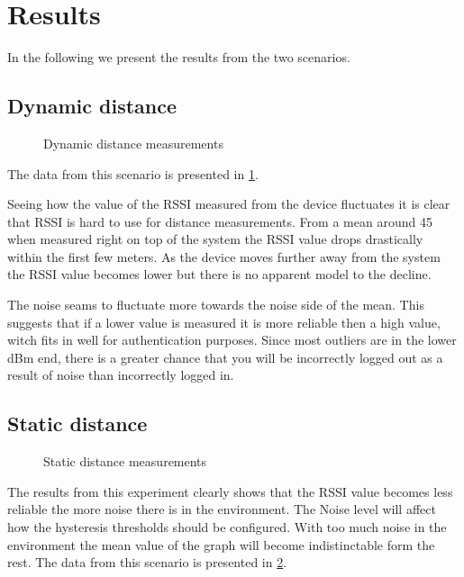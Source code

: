 \section{Results}
\label{sec_results}

In the following we present the results from the two scenarios.

\subsection{Dynamic distance}

\begin{figure}		
	
	
	
	\caption{ Dynamic distance measurements }
	\label{graf_DynamicMesurements}
	
\end{figure}

%	
%	
%	
%	


The data from this scenario is presented in \cref{graf_DynamicMesurements}.

Seeing how the value of the RSSI measured from the device fluctuates it is clear that RSSI is hard to use for distance measurements.
From a mean around 45 when measured right on top of the system the RSSI value drops drastically within the first few meters.
As the device moves further away from the system the RSSI value becomes lower but there is no apparent model to the decline.

The noise seams to fluctuate more towards the noise side of the mean. This suggests that if a lower value is measured it is more reliable then a high value, witch fits in well for authentication purposes.
Since most outliers are in the lower dBm end, there is a greater chance that you will be incorrectly logged out as a result of noise than incorrectly logged in.


\subsection{Static distance}
\begin{figure}
	
	
	\caption{Static distance measurements}
	\label{graf_StaticMesurements}
\end{figure}

The results from this experiment clearly shows that the RSSI value becomes less reliable the more noise there is in the environment.
The Noise level will affect how the hysteresis thresholds should be configured.
With too much noise in the environment the mean value of the graph will become indistinctable form the rest.
The data from this scenario is presented in \cref{graf_StaticMesurements}. 



